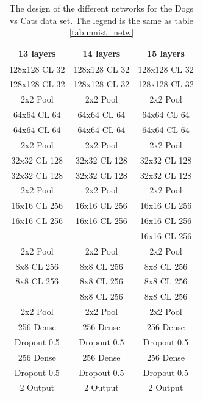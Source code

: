 \documentclass[%
 reprint,
 amsmath,amssymb,
 aps,
]{revtex4-1}
\begin{document}
\begin{table}[h]
\begin{tabular}{c | c | c}
13 layers & 14 layers & 15 layers  \\ \hline\hline
128x128 CL 32 & 128x128 CL 32 & 128x128 CL 32 \\
128x128 CL 32 & 128x128 CL 32 & 128x128 CL 32 \\
2x2 Pool & 2x2 Pool & 2x2 Pool \\
64x64 CL 64 & 64x64 CL 64 & 64x64 CL 64\\
64x64 CL 64 & 64x64 CL 64 & 64x64 CL 64\\
2x2 Pool & 2x2 Pool  & 2x2 Pool \\
32x32 CL 128 & 32x32 CL 128 & 32x32 CL 128\\
32x32 CL 128 & 32x32 CL 128 & 32x32 CL 128\\
 2x2 Pool & 2x2 Pool  & 2x2 Pool \\
16x16 CL 256 & 16x16 CL 256 & 16x16 CL 256\\
16x16 CL 256 & 16x16 CL 256 & 16x16 CL 256\\
 &  & 16x16 CL 256\\
  2x2 Pool & 2x2 Pool  & 2x2 Pool \\
8x8 CL 256 & 8x8 CL 256 & 8x8 CL 256\\
8x8 CL 256 & 8x8 CL 256 & 8x8 CL 256\\
 & 8x8 CL 256 & 8x8 CL 256\\
 2x2 Pool & 2x2 Pool  & 2x2 Pool \\
256 Dense & 256  Dense& 256 Dense\\
Dropout 0.5 & Dropout 0.5 & Dropout 0.5\\
256 Dense & 256  Dense& 256 Dense\\
Dropout 0.5 & Dropout 0.5 & Dropout 0.5\\
2 Output & 2 Output & 2 Output
\end{tabular}
\caption{The design of the different networks for the Dogs vs Cats data set. The legend is the same as table \ref{tab:mnist_netw}}
\label{tab:dvc_netw}
\end{table}
\end{document}
